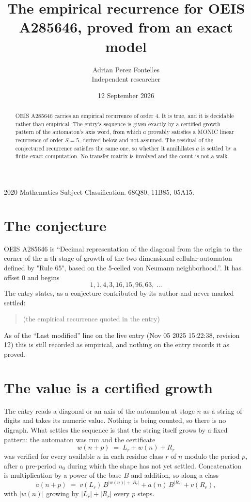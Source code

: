 \documentclass[11pt,a4paper]{article}
\title{The empirical recurrence for OEIS A285646, proved from an exact model}
\author{Adrian Perez Fontelles\\ \small Independent researcher}
\date{12 September 2026}
\theoremstyle{plain}
\theoremstyle{definition}
\begin{document}
\maketitle

\begin{abstract}
OEIS A285646 carries an empirical recurrence of order $4$. It is true, and it is
decidable rather than empirical. The entry's sequence is given exactly by a certified growth pattern of the automaton's axis word, from
which $a$ provably satisfies a MONIC linear recurrence of order $S=5$, derived below and not
assumed. The residual of the conjectured recurrence satisfies the same one, so whether it
annihilates $a$ is settled by a finite exact computation. No transfer matrix is involved and
the count is not a walk.
\end{abstract}

\noindent\small 2020 Mathematics Subject Classification. 68Q80, 11B85, 05A15.\normalsize

\section{The conjecture}

OEIS A285646 is ``Decimal representation of the diagonal from the origin to the corner of the n-th stage of growth of the two-dimensional cellular automaton defined by "Rule 65", based on the 5-celled von Neumann neighborhood.''. It has offset $0$ and begins
\[
1, 1, 4, 3, 16, 15, 96, 63,\ \dots
\]
The entry states, as a conjecture contributed by its author and never marked settled:
\begin{quote}
(the empirical recurrence quoted in the entry)
\end{quote}
As of the ``Last modified'' line on the live entry (Nov 05 2025 15:22:38, revision 12)
this is still recorded as empirical, and nothing on the entry records it as proved.

\section{The value is a certified growth}

The entry reads a diagonal or an axis of the automaton at stage $n$ as a string of digits and takes its
numeric value. Nothing is being counted, so there is no digraph. What settles the sequence is
that the string itself grows by a fixed pattern: the automaton was run and the certificate
\[
w(n+p)\;=\;L_r + w(n) + R_r
\]
was verified for every available $n$ in each residue class $r$ of $n$ modulo the period $p$,
after a pre-period $n_0$ during which the shape has not yet settled. Concatenation is
multiplication by a power of the base $B$ and addition, so along a class
\[
a(n+p)\;=\;v(L_r)\,B^{|w(n)|+|R_r|} + a(n)\,B^{|R_r|} + v(R_r),
\]
with $|w(n)|$ growing by $|L_r|+|R_r|$ every $p$ steps.
\end{document}

